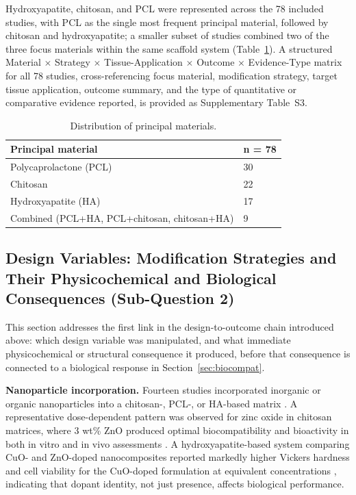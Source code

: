 \documentclass[5p,times,twocolumn]{elsarticle}
\begin{document}
Hydroxyapatite, chitosan, and PCL were represented across the 78 included studies, with PCL as the single most frequent principal material, followed by chitosan and hydroxyapatite; a smaller subset of studies combined two of the three focus materials within the same scaffold system (Table~\ref{tab:materials}). A structured Material $\times$ Strategy $\times$ Tissue-Application $\times$ Outcome $\times$ Evidence-Type matrix for all 78 studies, cross-referencing focus material, modification strategy, target tissue application, outcome summary, and the type of quantitative or comparative evidence reported, is provided as Supplementary Table~S3.

\begin{table}[h]
\caption{Distribution of principal materials.}
\label{tab:materials}
\small
\begin{tabular}{p{4.5cm}p{1.5cm}}
\hline
\textbf{Principal material} & \textbf{n = 78} \\
\hline
Polycaprolactone (PCL) & 30 \\
Chitosan & 22 \\
Hydroxyapatite (HA) & 17 \\
Combined (PCL+HA, PCL+chitosan, chitosan+HA) & 9 \\
\hline
\end{tabular}
\end{table}

\subsection{Design Variables: Modification Strategies and Their Physicochemical and Biological Consequences (Sub-Question 2)}
\label{sec:strategies}

This section addresses the first link in the design-to-outcome chain introduced above: which design variable was manipulated, and what immediate physicochemical or structural consequence it produced, before that consequence is connected to a biological response in Section~\ref{sec:biocompat}.

\textbf{Nanoparticle incorporation.} Fourteen studies incorporated inorganic or organic nanoparticles into a chitosan-, PCL-, or HA-based matrix \cite{ref4,ref6,ref8,ref9,ref12,ref19,ref22,ref24,ref27,ref31,ref68,ref71,ref72,ref74}. A representative dose-dependent pattern was observed for zinc oxide in chitosan matrices, where 3 wt\% ZnO produced optimal biocompatibility and bioactivity in both in vitro and in vivo assessments \cite{ref19}. A hydroxyapatite-based system comparing CuO- and ZnO-doped nanocomposites reported markedly higher Vickers hardness and cell viability for the CuO-doped formulation at equivalent concentrations \cite{ref22}, indicating that dopant identity, not just presence, affects biological performance.
\end{document}
